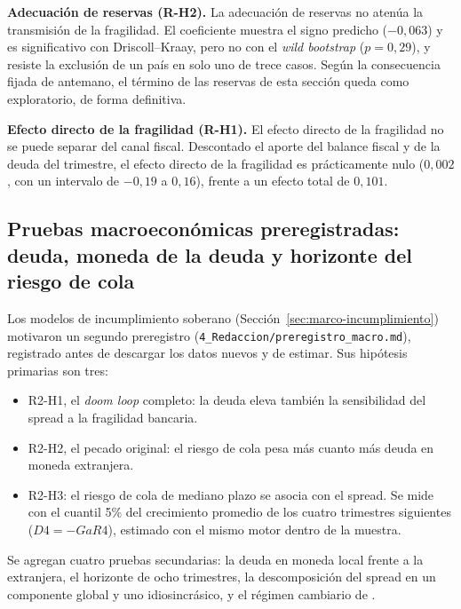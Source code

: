 \textbf{Adecuación de reservas (R-H2).} La adecuación de reservas no atenúa la transmisión de la fragilidad. El coeficiente muestra el signo predicho ($-0{,}063$) y es significativo con Driscoll--Kraay, pero no con el \textit{wild bootstrap} ($p=0{,}29$), y resiste la exclusión de un país en solo uno de trece casos. Según la consecuencia fijada de antemano, el término de las reservas de esta sección queda como exploratorio, de forma definitiva.

\textbf{Efecto directo de la fragilidad (R-H1).} El efecto directo de la fragilidad no se puede separar del canal fiscal. Descontado el aporte del balance fiscal y de la deuda del trimestre, el efecto directo de la fragilidad es prácticamente nulo ($0{,}002$, con un intervalo de $-0{,}19$ a $0{,}16$), frente a un efecto total de $0{,}101$.

\subsection{Pruebas macroeconómicas preregistradas: deuda, moneda de la deuda y horizonte del riesgo de cola}
\label{sec:macro-prereg}

Los modelos de incumplimiento soberano (Sección~\ref{sec:marco-incumplimiento}) motivaron un segundo preregistro (\texttt{4\_Redaccion/preregistro\_macro.md}), registrado antes de descargar los datos nuevos y de estimar. Sus hipótesis primarias son tres:
\begin{itemize}
    \item R2-H1, el \textit{doom loop} completo: la deuda eleva también la sensibilidad del spread a la fragilidad bancaria.
    \item R2-H2, el pecado original: el riesgo de cola pesa más cuanto más deuda en moneda extranjera.
    \item R2-H3: el riesgo de cola de mediano plazo se asocia con el spread. Se mide con el cuantil 5\% del crecimiento promedio de los cuatro trimestres siguientes ($D4=-GaR4$), estimado con el mismo motor dentro de la muestra.
\end{itemize}
Se agregan cuatro pruebas secundarias: la deuda en moneda local frente a la extranjera, el horizonte de ocho trimestres, la descomposición del spread en un componente global y uno idiosincrásico, y el régimen cambiario de \citet{IlzetzkiReinhartRogoff2019}.


